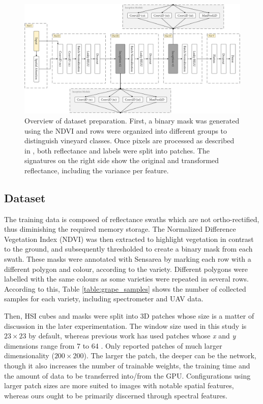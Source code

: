 \begin{figure}[ht]
    \centering
    \includegraphics[width=\linewidth]{figs/vineyard_classification/network.png}
	\caption{Overview of dataset preparation. First, a binary mask was generated using the NDVI and rows were organized into different groups to distinguish vineyard classes. Once pixels are processed as described in , both reflectance and labels were split into patches. The signatures on the right side show the original and transformed reflectance, including the variance per feature. }
	\label{fig:vineyard_cnn_network}
\end{figure}

\subsection{Dataset}

The training data is composed of reflectance swaths which are not ortho-rectified, thus diminishing the required memory storage. The Normalized Difference Vegetation Index (NDVI) was then extracted to highlight vegetation in contrast to the ground, and subsequently thresholded to create a binary mask from each swath. These masks were annotated with Sensarea \cite{bertolino_sensarea_2012} by marking each row with a different polygon and colour, according to the variety. Different polygons were labelled with the same colours as some varieties were repeated in several rows. According to this, Table \ref{table:grape_samples} shows the number of collected samples for each variety, including spectrometer and UAV data. 

Then, HSI cubes and masks were split into 3D patches whose size is a matter of discussion in the later experimentation. The window size used in this study is $23 \times 23$ by default, whereas previous work has used patches whose \textit{x} and \textit{y} dimensions range from 7 \cite{roy_attention-based_2021} to 64 \cite{chakraborty_spectralnet_2021}. Only \cite{liu_plant_2022} reported patches of much larger dimensionality ($200 \times 200$). The larger the patch, the deeper can be the network, though it also increases the number of trainable weights, the training time and the amount of data to be transferred into/from the GPU. Configurations using larger patch sizes are more suited to images with notable spatial features, whereas ours ought to be primarily discerned through spectral features. 

